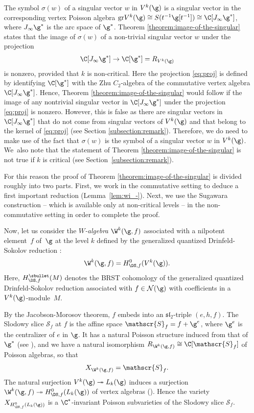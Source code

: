 The symbol $\sigma(w)$
of a singular vector $w$ in $V^k(\g)$ is
a singular vector
in the corresponding vertex Poisson algebra
$\mathrm{gr} V^k(\g) \cong S(t^{-1}\g[t^{-1}])\cong \C[J_{\infty}\g^*]$,
where $J_\infty \g^*$ is the arc space of $\g^*$.
Theorem \ref{theorem:image-of-the-singular}
states that
the image of $\sigma(w)$
of a non-trivial singular vector $w$
under the projection
\begin{equation}
\C[J_{\infty}\g^*]\to \C[\g^*]=R_{V^k(\g)}
\label{eq:proj}
\end{equation}
is nonzero,
provided that $k$ is non-critical.
Here the projection \eqref{eq:proj} is defined by identifying $\C[\g^*]$ with the
Zhu $C_2$-algebra of the commutative vertex algebra $\C[J_{\infty}\g^*]$.
Hence,
Theorem \ref{theorem:image-of-the-singular}
would follow if
the image of any nontrivial singular vector
in $\C[J_{\infty}\g^*]$
under the projection \eqref{eq:proj}
is nonzero.
However, this is false
as there are singular vectors in $\C[J_{\infty}\g^*]$
that do not come from singular vectors of $V^k(\g)$
and that belong to the kernel of \eqref{eq:proj}
(see Section \ref{subsection:remark}).
Therefore,
we do need to make use of the fact that
$\sigma(w)$ is the symbol of a singular vector $w$ in $V^k(\g)$.
We~also note that
the statement of Theorem \ref{theorem:image-of-the-singular}
is not true if $k$ is critical (see Section~\ref{subsection:remark}).

For this reason the proof of Theorem \ref{theorem:image-of-the-singular}
is divided roughly into two parts.
First, we work in the commutative setting
to deduce
a first important reduction (Lemma~\ref{lem:wi_-}).
Next, we use the Sugawara construction --
which is available only at non-critical levels -- in the non-commutative setting
in order to complete the proof.

Now, let us consider the \emph{$W$-algebra} $\W^k(\g,f)$ associated with
a nilpotent element~$f$ of~$\g$ at the level $k$
defined by the generalized quantized Drinfeld-Sokolov reduction
\cite{FeiFre90,KacRoaWak03}:
\[
\W^k(\g,f)=H^{0}_{\DS,f}(V^k(\g)).
\]
Here, $H^{\sbullet}_{\DS,f}(M)$ denotes the BRST
cohomology of the generalized quantized Drinfeld-Sokolov reduction
associated with $f \in \mathcal{N}(\g)$ with coefficients in
a $V^k(\g)$-module~$M$.

By the Jacobson-Morosov theorem, $f$ embeds into an $\mathfrak{sl}_2$-triple
$(e,h,f)$. The Slodowy slice $\mathscr{S}_{f}$ at $f$ is
the affine
space $\mathscr{S}_{f}=f+\g^{e}$, where $\g^{e}$
is the centralizer of $e$ in $\g$.
It has a natural Poisson structure induced from that of $\g^*$ (see \cite{GanGin02}),
and we have \cite{DSK06,Ara09b} a natural isomorphism
$R_{\W^k(\g,f)}\cong \C[\mathscr{S}_{f}]$ of Poisson algebras, so that
\begin{equation*}
X_{\W^k(\g,f)}= \mathscr{S}_{f}.
\end{equation*}
The natural surjection
$V^k(\g)\twoheadrightarrow L_k(\g)$
induces a surjection
$\W^k(\g,f)\twoheadrightarrow H_{\DS,f}^0(L_k(\g))$
of vertex algebras (\cite{Ara09b}).
Hence the variety
$X_{H^{0}_{\DS,f}(L_k(\g))}$
is a $\C^*$-invariant Poisson
subvarieties of the Slodowy slice $\mathscr{S}_f$.

